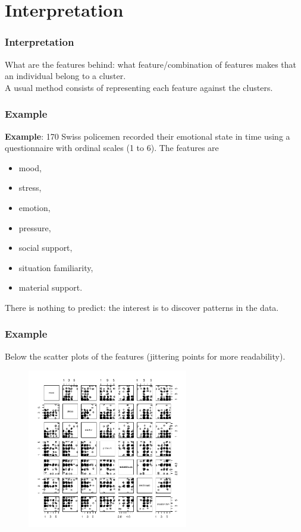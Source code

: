 \section{Interpretation}
\begin{frame}
\frametitle{Interpretation}
What are the features behind: what feature/combination of features makes that an individual belong to a cluster.\\
\vspace{0.3cm}
A usual method consists of representing each feature against the clusters.
\end{frame}
\begin{frame}
\frametitle{Example}
{\bf Example}: 170 Swiss policemen recorded their emotional state in time using a questionnaire with ordinal scales (1 to 6). The features are 
\begin{itemize}
\item mood, 
\item stress, 
\item emotion, 
\item pressure, 
\item social support, 
\item situation familiarity, 
\item material support.
\end{itemize}
There is nothing to predict: the interest is to discover patterns in the data. 
\end{frame}
\begin{frame}
\frametitle{Example}
Below the scatter plots of the features (jittering points for more readability).
\begin{figure}[!h]
\centerline{\includegraphics[width=7cm]{../../Graphs/Polstress-scat-jit.pdf}}
\end{figure}
\end{frame}
